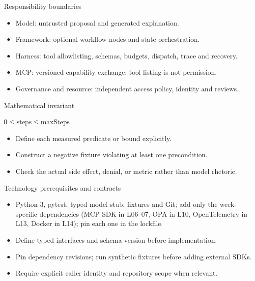 \documentclass[aspectratio=169,10pt]{beamer}
\begin{document}
\begin{frame}{Responsibility boundaries}
\small
\begin{itemize}
\item Model: untrusted proposal and generated explanation.
\item Framework: optional workflow nodes and state orchestration.
\item Harness: tool allowlisting, schemas, budgets, dispatch, trace and recovery.
\item MCP: versioned capability exchange; tool listing is not permission.
\item Governance and resource: independent access policy, identity and reviews.
\end{itemize}

\end{frame}

\begin{frame}{Mathematical invariant}
\small
\begin{center}\Large $0\leq\mathrm{steps}\leq\mathrm{maxSteps}$\end{center}
\begin{itemize}
\item Define each measured predicate or bound explicitly.
\item Construct a negative fixture violating at least one precondition.
\item Check the actual side effect, denial, or metric rather than model rhetoric.
\end{itemize}

\end{frame}

\begin{frame}{Technology prerequisites and contracts}
\small
\begin{itemize}
\item Python 3, pytest, typed model stub, fixtures and Git; add only the week-specific dependencies (MCP SDK in L06--07, OPA in L10, OpenTelemetry in L13, Docker in L14); pin each one in the lockfile.
\item Define typed interfaces and schema version before implementation.
\item Pin dependency revisions; run synthetic fixtures before adding external SDKs.
\item Require explicit caller identity and repository scope when relevant.
\end{itemize}

\end{frame}
\end{document}
